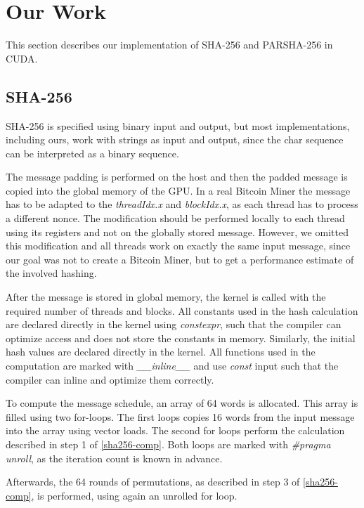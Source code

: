 \documentclass[letterpaper]{article}
\begin{document}
\section{Our Work}\label{sec:yourmethod}

This section describes our implementation of SHA-256 and PARSHA-256 in CUDA.

\subsection{SHA-256}
SHA-256 is specified using binary input and output, but most implementations, including ours, work with strings as input and output, since the char sequence can be interpreted as a binary sequence. 

The message padding is performed on the host and then the padded message is copied into the global memory of the GPU. In a real Bitcoin Miner the message has to be adapted to the \emph{threadIdx.x} and \emph{blockIdx.x}, as each thread has to process a different nonce. The modification should be performed locally to each thread using its registers and not on the globally stored message. However, we omitted this modification and all threads work on exactly the same input message, since our goal was not to create a Bitcoin Miner, but to get a performance estimate of the involved hashing.

After the message is stored in global memory, the kernel is called with the required number of threads and blocks.
All constants used in the hash calculation are declared directly in the kernel using \emph{constexpr}, such that the compiler can optimize access and does not store the constants in memory. Similarly, the initial hash values are declared directly in the kernel. All functions used in the computation are marked with \emph{\_\_inline\_\_} and use \emph{const} input such that the compiler can inline and optimize them correctly.

To compute the message schedule, an array of 64 words is allocated. This array is filled using two for-loops. The first loops copies 16 words from the input message into the array using vector loads. The second for loops perform the calculation described in step 1 of \ref{sha256-comp}. Both loops are marked with \emph{\#pragma unroll}, as the iteration count is known in advance. 

Afterwards, the 64 rounds of permutations, as described in step 3 of \ref{sha256-comp}, is performed, using again an unrolled for loop.
\end{document}
